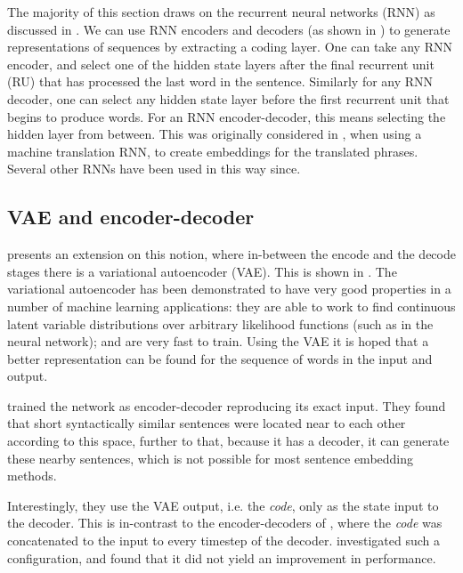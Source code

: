 \documentclass[12pt,parskip]{komatufte}
\begin{document}
The majority of this section draws on the recurrent neural networks (RNN) as discussed in .
We can use RNN encoders and decoders (as shown in ) to generate representations of sequences by extracting a coding layer.
One can take any RNN encoder,
and select one of the hidden state layers after the final recurrent unit (RU) that has processed the last word in the sentence.
Similarly for any RNN decoder, one can select any hidden state layer before the first recurrent unit that begins to produce words.
For an RNN encoder-decoder, this means selecting the hidden layer from between.
This was originally considered in , when using a machine translation RNN, to create embeddings for the translated phrases.
Several other RNNs have been used in this way since.

\subsection{VAE and encoder-decoder}\label{sec:vae-and-encoder-decoder}
 presents an extension on this notion,
where in-between the encode and the decode stages there is a variational autoencoder (VAE).
This is shown in .
The variational autoencoder  has been demonstrated to have very good properties in a number of machine learning applications: they are able to work to find continuous latent variable distributions over arbitrary likelihood functions (such as in the neural network); and are very fast to train.
Using the VAE it is hoped that a better representation can be found for the sequence of words in the input and output.


\textcite{Bowman2015SmoothGeneration} trained the network as encoder-decoder reproducing its exact input.
They found that short syntactically similar sentences were located near to each other according to this space,
further to that, because it has a decoder, it can generate these nearby sentences,
which is not possible for most sentence embedding methods.

Interestingly, they use the VAE output, i.e. the \emph{code}, only as the state input to the decoder.
This is in-contrast to the encoder-decoders of \textcite{cho-EtAl:2014:EMNLP2014},
where the \emph{code} was concatenated to the input to every timestep of the decoder.
\textcite{Bowman2015SmoothGeneration} investigated such a configuration,
and found that it did not yield an improvement in performance.
\end{document}
